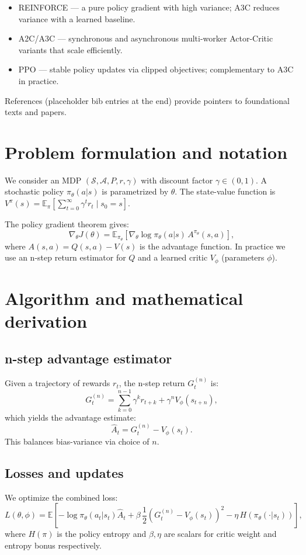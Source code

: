 \documentclass[11pt]{article}
\begin{document}
\begin{itemize}
  \item REINFORCE \cite{williams1992simple} — a pure policy gradient with high variance; A3C reduces variance with a learned baseline.
  \item A2C/A3C \cite{mnih2016asynchronous} — synchronous and asynchronous multi-worker Actor-Critic variants that scale efficiently.
  \item PPO \cite{schulman2017proximal} — stable policy updates via clipped objectives; complementary to A3C in practice.
\end{itemize}

References (placeholder bib entries at the end) provide pointers to foundational texts and papers.

\section{Problem formulation and notation}
We consider an MDP \( (\mathcal{S}, \mathcal{A}, P, r, \gamma) \) with discount factor \( \gamma \in (0,1) \). A stochastic policy \( \pi_\theta(a|s) \) is parametrized by \(\theta\). The state-value function is \(V^\pi(s)=\mathbb{E}_\pi\left[\sum_{t=0}^\infty \gamma^t r_{t} \mid s_0=s\right]\).

The policy gradient theorem gives:
\[
\nabla_\theta J(\theta) = \mathbb{E}_{\pi_\theta}\left[ \nabla_\theta \log \pi_\theta(a|s) \, A^{\pi_\theta}(s,a) \right],
\]
where \(A(s,a) = Q(s,a) - V(s)\) is the advantage function. In practice we use an n-step return estimator for \(Q\) and a learned critic \(V_\phi\) (parameters \(\phi\)).

\section{Algorithm and mathematical derivation}
\subsection{n-step advantage estimator}
Given a trajectory of rewards \(r_t\), the n-step return \(G_t^{(n)}\) is:
\[
G_t^{(n)} = \sum_{k=0}^{n-1} \gamma^k r_{t+k} + \gamma^n V_\phi(s_{t+n}),
\]
which yields the advantage estimate:
\[
\hat A_t = G_t^{(n)} - V_\phi(s_t).
\]
This balances bias-variance via choice of \(n\).

\subsection{Losses and updates}
We optimize the combined loss:
\[
L(\theta, \phi) = \mathbb{E}\left[-\log \pi_\theta(a_t|s_t)\hat A_t + \beta \, \frac12\left(G_t^{(n)}-V_\phi(s_t)\right)^2 - \eta \, H(\pi_\theta(\cdot|s_t))\right],
\]
where \(H(\pi)\) is the policy entropy and \(\beta,\eta\) are scalars for critic weight and entropy bonus respectively.
\end{document}
